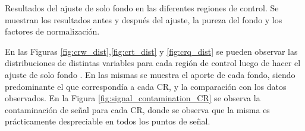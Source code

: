 \begin{table}[ht!]
  \centering
  \caption{Resultados del ajuste de solo fondo en las diferentes regiones de control. Se muestran los resultados antes y después del ajuste, la pureza del fondo y los factores de normalización.}
  
  \label{tab:bkgonly_cr}
\end{table}

En las Figuras \ref{fig:crw_dist},\ref{fig:crt_dist} y \ref{fig:crq_dist} se pueden observar las distribuciones de distintas variables para cada región de control luego de hacer el ajuste de solo fondo . En las mismas se muestra el aporte de cada fondo, siendo predominante el que correspondía a cada CR, y la comparación con los datos observados. En la Figura \ref{fig:signal_contamination_CR} se observa la contaminación de señal para cada CR, donde se observa que la misma es prácticamente despreciable en todos los puntos de señal.



